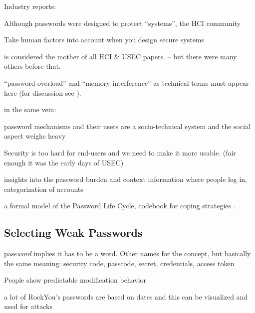 Industry reports: \cite{CSID2012PasswordHabits}


Although passwords were designed to protect ``systems'', the HCI community


Take human factors into account when you design secure systems \cite{Sasse2005UsableSecurityPosition}


\cite{Adams1999UsersEnemy} is considered the mother of all HCI \& USEC papers. -- but there were many others before that.



``password overload'' and ``memory interference'' as technical terms must appear here (for discussion see \cite{Yang2016MnemonicSentenceBased}).

in the same vein: \cite{Chiasson2009InterferencesGraphical}


password mechanisms and their users are a socio-technical system and the social aspect weighs heavy \cite{Weirich2001PrettyGoodPersuasion}

Security is too hard for end-users and we need to make it more usable. (fair enough it was the early days of USEC) \cite{Dourish2004UserStrategiesEveryday}

insights into the password burden and context information where people log in, categorization of accounts \cite{Hayashi2011DiaryStudyPWs}


a formal model of the Password Life Cycle, codebook for coping strategies \cite{Stobert2014PasswordLifeCycle}.

	\subsection{Selecting Weak Passwords}

	pass\textit{word} implies it has to be a word. Other names for the concept, but basically the same meaning: security code, passcode, secret, credentials, access token
	
	\cite{Jakobsson2013BenefitsUnderstandingPWs}
	
	People show predictable modification behavior \cite{Gaw2005ReuseRecycle}
	
	
	a lot of RockYou's passwords are based on dates and this can be visualized and used for attacks \cite{Veras2012VisualizingSemanticsPasswords}
	
